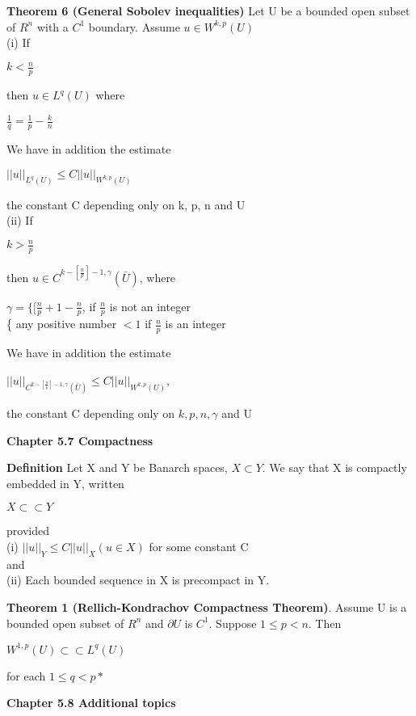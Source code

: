 \documentclass{article}
\newcommand\tab[1][1cm]{\hspace*{#1}}
\begin{document}
\textbf {Theorem 6 (General Sobolev inequalities)} Let U be a bounded open subset of $R^n$ with a $C^1$ boundary. Assume $u \in W^{k,p}(U)$ \\
\tab (i) If
 \begin{center}
$ k < \frac{n}{p}$
\end{center}
then $u \in L^q (U)$ where
 \begin{center}
$ \frac{1}{q} = \frac{1}{p} - \frac{k}{n}$
\end{center}
We have in addition the estimate 
 \begin{center}
$||u||_{L^{q}(U)} \leq C||u||_{W^{k,p} (U)}$
\end{center}
the constant C depending only on k, p, n and U \\
\tab (ii) If
 \begin{center}
$k > \frac{n}{p}$
\end{center}
then $u \in C^{k-[\frac{n}{p}]-1, \gamma} (\bar{U})$, where
 \begin{center}
$\gamma = \{ [\frac{n}{p} + 1 - \frac{n}{p}$, if $\frac{n}{p}$ is not an integer \\
\tab \{ any positive number $< 1$ if $\frac{n}{p}$ is an integer
\end{center}
We have in addition the estimate
 \begin{center}
$||u||_{C^{k-[\frac{n}{p}]-1, \gamma}(\bar{U})} \leq C||u||_{W^{k,p}(U)}$,
\end{center}
the constant C depending only on $k, p, n, \gamma$ and U

\textbf {Chapter 5.7 Compactness}

\textbf {Definition} Let X and Y be Banarch spaces, $X \subset Y$. We say that X is compactly embedded in Y, written
 \begin{center}
$X \subset \subset Y$
\end{center}
provided \\
\tab (i) $||u||_Y \leq C||u||_X (u \in X)$ for some constant C \\
and \\
\tab (ii) Each bounded sequence in X is precompact in Y.

\textbf {Theorem 1 (Rellich-Kondrachov Compactness Theorem)}. Assume U is a bounded open subset of $R^n$ and $\partial U$ is $C^1$. Suppose $1 \leq p < n$. Then 
 \begin{center}
$W^{1,p}(U) \subset \subset L^q (U)$
\end{center}
for each $1 \leq q < p*$

\textbf {Chapter 5.8 Additional topics}
\end{document}
